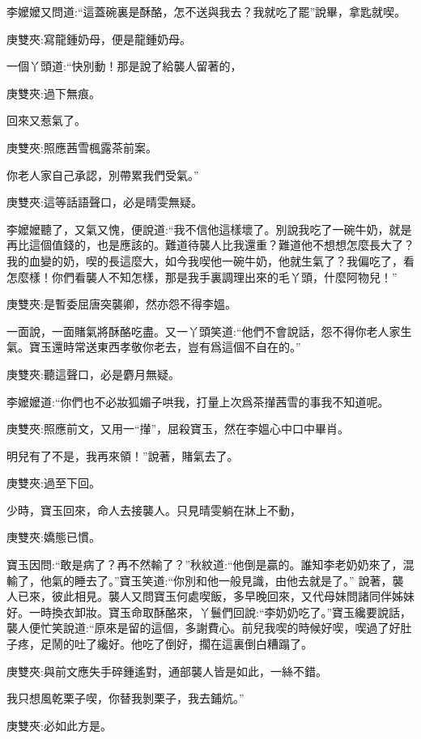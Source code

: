 \begin{parag}
    李嬤嬤又問道:“這蓋碗裏是酥酪，怎不送與我去？我就吃了罷”說畢，拿匙就喫。\begin{note}庚雙夾:寫龍鍾奶母，便是龍鍾奶母。\end{note}一個丫頭道:“快別動！那是說了給襲人留著的，\begin{note}庚雙夾:過下無痕。\end{note}回來又惹氣了。\begin{note}庚雙夾:照應茜雪楓露茶前案。\end{note}你老人家自己承認，別帶累我們受氣。”\begin{note}庚雙夾:這等話語聲口，必是晴雯無疑。\end{note}李嬤嬤聽了，又氣又愧，便說道:“我不信他這樣壞了。別說我吃了一碗牛奶，就是再比這個值錢的，也是應該的。難道待襲人比我還重？難道他不想想怎麼長大了？我的血變的奶，喫的長這麼大，如今我喫他一碗牛奶，他就生氣了？我偏吃了，看怎麼樣！你們看襲人不知怎樣，那是我手裏調理出來的毛丫頭，什麼阿物兒！”\begin{note}庚雙夾:是暫委屈唐突襲卿，然亦怨不得李媼。\end{note}一面說，一面賭氣將酥酪吃盡。又一丫頭笑道:“他們不會說話，怨不得你老人家生氣。寶玉還時常送東西孝敬你老去，豈有爲這個不自在的。”\begin{note}庚雙夾:聽這聲口，必是麝月無疑。\end{note}李嬤嬤道:“你們也不必妝狐媚子哄我，打量上次爲茶攆茜雪的事我不知道呢。\begin{note}庚雙夾:照應前文，又用一“攆”，屈殺寶玉，然在李媼心中口中畢肖。\end{note}明兒有了不是，我再來領！”說著，賭氣去了。\begin{note}庚雙夾:過至下回。\end{note}
\end{parag}


\begin{parag}
    少時，寶玉回來，命人去接襲人。只見晴雯躺在牀上不動，\begin{note}庚雙夾:嬌態已慣。\end{note}寶玉因問:“敢是病了？再不然輸了？”秋紋道:“他倒是贏的。誰知李老奶奶來了，混輸了，他氣的睡去了。”寶玉笑道:“你別和他一般見識，由他去就是了。” 說著，襲人已來，彼此相見。襲人又問寶玉何處喫飯，多早晚回來，又代母妹問諸同伴姊妹好。一時換衣卸妝。寶玉命取酥酪來，丫鬟們回說:“李奶奶吃了。”寶玉纔要說話，襲人便忙笑說道:“原來是留的這個，多謝費心。前兒我喫的時候好喫，喫過了好肚子疼，足鬧的吐了纔好。他吃了倒好，擱在這裏倒白糟蹋了。\begin{note}庚雙夾:與前文應失手碎鍾遙對，通部襲人皆是如此，一絲不錯。\end{note}我只想風乾栗子喫，你替我剝栗子，我去鋪炕。”\begin{note}庚雙夾:必如此方是。\end{note}
\end{parag}


